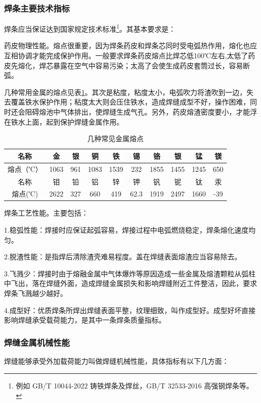 \documentclass{ctexbook}
\begin{document}
\subsubsection{焊条主要技术指标}
焊条应当保证达到国家规定技术标准\footnote{例如 GB/T 10044-2022  铸铁焊条及焊丝，GB/T 32533-2016  高强钢焊条等。}。其基本要求是：

药皮物理性能。熔点很重要，因为焊条药皮和焊条芯同时受电弧热作用，熔化也应互相协调才能完成保护作用。一般要求焊条药皮熔点比焊芯低100℃左右,太低了药皮先熔化，焊芯暴露在空气中容易污染；太高了会使生成药皮套筒过长，容易断弧。

几种常用金属的熔点见表\ref{tab:jizhongchangjian}。其次是粘度，粘度太小，电弧吹力将渣吹到一边，失去覆盖铁水保护作用；粘度太大则会压住铁水，造成焊缝成型不好，操作困难，同时还会阻碍熔池中气体排出，使焊缝生成气孔。另外，药皮熔渣密度要小，才能浮在铁水上面，起到保护焊缝金属作用。
\begin{table}[htbp]
	\centering
	\caption{几种常见金属熔点}
	\begin{tabular}{c|c|c|c|c|c|c|c|c|c}
		\toprule
		名称    & 金     & 银     & 铜     & 铁     & 锡     & 铬     & 银     & 锰     & 镁 \\
		\midrule
		熔点（℃） & 1063  & 961   & 1083  & 1539  & 232   & 1855  & 1455  & 1245  & 650 \\
		\midrule
		名称    & 钼     & 铅     & 铝     & 锌     & 钾     & 钒     & 铌     & 钛     & 汞 \\
		\midrule
		熔点(℃) & 2622  & 327   & 660   & 419   & 62.3  & 1919  & 2497  & 1660  & -39 \\
		\bottomrule
	\end{tabular}%
	\label{tab:jizhongchangjian}%
\end{table}%

焊条工艺性能。主要包括：

1.稳弧性能：焊接时应保证起弧容易，焊接过程中电弧燃烧稳定，焊条熔化速度均匀。

2.脱渣性能：是指焊后清除渣壳难易程度。盖在焊缝表面熔渣应当容易除去。

3.飞溅少：焊接时由于熔融金属中气体爆炸等原因造成一些金属及熔渣颗粒从弧柱中飞出，落在焊缝外面，造成焊缝金属损失和影响焊缝附近工件整洁，因此，要求焊条飞溅越少越好。

4.成型好：优质焊条所焊出焊缝表面平整，纹理细致，叫作成型好。成型好坏直接影响焊缝承受载荷能力，是其中一条焊条质量指标。
\subsubsection{焊缝金属机械性能}
焊缝能够承受外加载荷能力叫做焊缝机械性能，具体指标有以下几方面：
\end{document}
